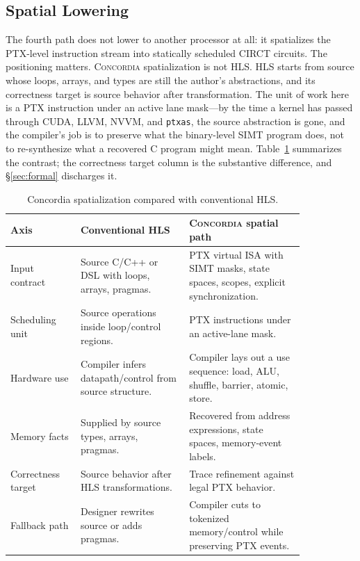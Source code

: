 \documentclass[sigplan,nonacm]{acmart}
\newcommand{\sys}{\textsc{Concordia}\xspace}
\newcommand{\circt}{CIRCT\xspace}
\begin{document}
\subsection{Spatial Lowering}
\label{sec:spatial}

The fourth path does not lower to another processor at all: it spatializes
the PTX-level instruction stream into statically scheduled \circt circuits.
The positioning matters.  \sys spatialization is not HLS.  HLS starts from
source whose loops, arrays, and types are still the author's abstractions,
and its correctness target is source behavior after transformation.  The
unit of work here is a PTX instruction under an active lane mask---by the
time a kernel has passed through CUDA, LLVM, NVVM, and \texttt{ptxas}, the
source abstraction is gone, and the compiler's job is to preserve what the
binary-level SIMT program does, not to re-synthesize what a recovered C
program might mean.  Table~\ref{tab:hls-diff} summarizes the contrast; the
correctness target column is the substantive difference, and
\S\ref{sec:formal} discharges it.

\begin{table}[t]
\centering
\caption{Concordia spatialization compared with conventional HLS.}
\label{tab:hls-diff}
\small
\begin{tabular}{p{0.20\linewidth}p{0.31\linewidth}p{0.33\linewidth}}
\toprule
Axis & Conventional HLS & \sys spatial path \\
\midrule
Input contract & Source C/C++ or DSL with loops, arrays, pragmas. &
PTX virtual ISA with SIMT masks, state spaces, scopes, explicit
synchronization. \\
Scheduling unit & Source operations inside loop/control regions. &
PTX instructions under an active-lane mask. \\
Hardware use & Compiler infers datapath/control from source structure. &
Compiler lays out a use sequence: load, ALU, shuffle, barrier, atomic,
store. \\
Memory facts & Supplied by source types, arrays, pragmas. & Recovered from
address expressions, state spaces, memory-event labels. \\
Correctness target & Source behavior after HLS transformations. & Trace
refinement against legal PTX behavior. \\
Fallback path & Designer rewrites source or adds pragmas. & Compiler cuts
to tokenized memory/control while preserving PTX events. \\
\bottomrule
\end{tabular}
\end{table}
\end{document}
